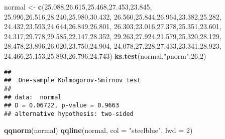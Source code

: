 \documentclass[]{article}
\newenvironment{Shaded}{\begin{snugshade}}{\end{snugshade}}
\newcommand{\KeywordTok}[1]{\textcolor[rgb]{0.13,0.29,0.53}{\textbf{#1}}}
\newcommand{\DataTypeTok}[1]{\textcolor[rgb]{0.13,0.29,0.53}{#1}}
\newcommand{\DecValTok}[1]{\textcolor[rgb]{0.00,0.00,0.81}{#1}}
\newcommand{\FloatTok}[1]{\textcolor[rgb]{0.00,0.00,0.81}{#1}}
\newcommand{\StringTok}[1]{\textcolor[rgb]{0.31,0.60,0.02}{#1}}
\newcommand{\NormalTok}[1]{#1}
\begin{document}
\begin{Shaded}
\begin{Highlighting}[]
\NormalTok{normal <-}\StringTok{ }\KeywordTok{c}\NormalTok{(}\FloatTok{25.088}\NormalTok{,}\FloatTok{26.615}\NormalTok{,}\FloatTok{25.468}\NormalTok{,}\FloatTok{27.453}\NormalTok{,}\FloatTok{23.845}\NormalTok{,}
\FloatTok{25.996}\NormalTok{,}\FloatTok{26.516}\NormalTok{,}\FloatTok{28.240}\NormalTok{,}\FloatTok{25.980}\NormalTok{,}\FloatTok{30.432}\NormalTok{,}
\FloatTok{26.560}\NormalTok{,}\FloatTok{25.844}\NormalTok{,}\FloatTok{26.964}\NormalTok{,}\FloatTok{23.382}\NormalTok{,}\FloatTok{25.282}\NormalTok{,}
\FloatTok{24.432}\NormalTok{,}\FloatTok{23.593}\NormalTok{,}\FloatTok{24.644}\NormalTok{,}\FloatTok{26.849}\NormalTok{,}\FloatTok{26.801}\NormalTok{,}
\FloatTok{26.303}\NormalTok{,}\FloatTok{23.016}\NormalTok{,}\FloatTok{27.378}\NormalTok{,}\FloatTok{25.351}\NormalTok{,}\FloatTok{23.601}\NormalTok{,}
\FloatTok{24.317}\NormalTok{,}\FloatTok{29.778}\NormalTok{,}\FloatTok{29.585}\NormalTok{,}\FloatTok{22.147}\NormalTok{,}\FloatTok{28.352}\NormalTok{,}
\FloatTok{29.263}\NormalTok{,}\FloatTok{27.924}\NormalTok{,}\FloatTok{21.579}\NormalTok{,}\FloatTok{25.320}\NormalTok{,}\FloatTok{28.129}\NormalTok{,}
\FloatTok{28.478}\NormalTok{,}\FloatTok{23.896}\NormalTok{,}\FloatTok{26.020}\NormalTok{,}\FloatTok{23.750}\NormalTok{,}\FloatTok{24.904}\NormalTok{,}
\FloatTok{24.078}\NormalTok{,}\FloatTok{27.228}\NormalTok{,}\FloatTok{27.433}\NormalTok{,}\FloatTok{23.341}\NormalTok{,}\FloatTok{28.923}\NormalTok{,}
\FloatTok{24.466}\NormalTok{,}\FloatTok{25.153}\NormalTok{,}\FloatTok{25.893}\NormalTok{,}\FloatTok{26.796}\NormalTok{,}\FloatTok{24.743}\NormalTok{)}
\KeywordTok{ks.test}\NormalTok{(normal,}\StringTok{"pnorm"}\NormalTok{,}\DecValTok{26}\NormalTok{,}\DecValTok{2}\NormalTok{)}
\end{Highlighting}
\end{Shaded}

\begin{verbatim}
## 
##  One-sample Kolmogorov-Smirnov test
## 
## data:  normal
## D = 0.06722, p-value = 0.9663
## alternative hypothesis: two-sided
\end{verbatim}

\begin{Shaded}
\begin{Highlighting}[]
\KeywordTok{qqnorm}\NormalTok{(normal)}
\KeywordTok{qqline}\NormalTok{(normal, }\DataTypeTok{col =} \StringTok{"steelblue"}\NormalTok{, }\DataTypeTok{lwd =} \DecValTok{2}\NormalTok{)}
\end{Highlighting}
\end{Shaded}
\end{document}
